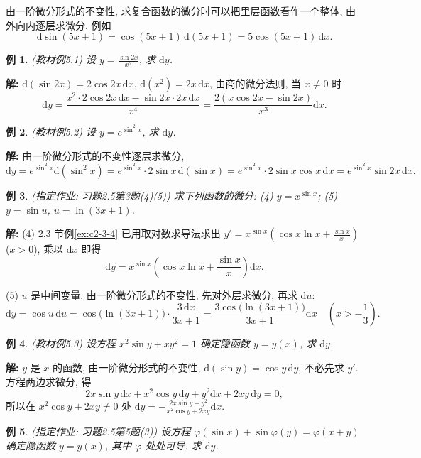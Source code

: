\documentclass[UTF8,openany]{ctexbook}
\theoremstyle{chinesetextbook}
\newtheorem{example}{例}[section]
\newenvironment{cnsolution}{\par\indent\textbf{解:} \ignorespaces}{\par}
\newcommand{\dd}{\mathrm d}
\begin{document}
由一阶微分形式的不变性, 求复合函数的微分时可以把里层函数看作一个整体, 由外向内逐层求微分. 例如
\[
\dd\sin(5x+1)=\cos(5x+1)\,\dd(5x+1)=5\cos(5x+1)\,\dd x.
\]
\begin{example}\label{ex:c2-5-1}
\textnormal{(教材例5.1)} 设 $\displaystyle y=\frac{\sin2x}{x^2}$, 求 $\dd y$.
\end{example}
\begin{cnsolution}
$\dd(\sin2x)=2\cos2x\,\dd x$, $\dd(x^2)=2x\,\dd x$, 由商的微分法则, 当 $x\ne0$ 时
\[
\dd y=\frac{x^2\cdot2\cos2x\,\dd x-\sin2x\cdot2x\,\dd x}{x^4}=\frac{2(x\cos2x-\sin2x)}{x^3}\dd x.
\]
\end{cnsolution}
\begin{example}\label{ex:c2-5-2}
\textnormal{(教材例5.2)} 设 $y=e^{\sin^2x}$, 求 $\dd y$.
\end{example}
\begin{cnsolution}
由一阶微分形式的不变性逐层求微分,
\[
\dd y=e^{\sin^2x}\dd(\sin^2x)=e^{\sin^2x}\cdot2\sin x\,\dd(\sin x)=e^{\sin^2x}\cdot2\sin x\cos x\,\dd x=e^{\sin^2x}\sin2x\,\dd x.
\]
\end{cnsolution}
\begin{example}\label{ex:c2-h5-3}
\textnormal{(指定作业: 习题2.5第3题(4)(5))} 求下列函数的微分: (4) $y=x^{\sin x}$; (5) $y=\sin u$, $u=\ln(3x+1)$.
\end{example}
\begin{cnsolution}
(4) 2.3 节例\ref{ex:c2-3-4} 已用取对数求导法求出 $\displaystyle y'=x^{\sin x}\left(\cos x\ln x+\frac{\sin x}x\right)$ ($x>0$), 乘以 $\dd x$ 即得
\[
\dd y=x^{\sin x}\left(\cos x\ln x+\frac{\sin x}x\right)\dd x.
\]

(5) $u$ 是中间变量. 由一阶微分形式的不变性, 先对外层求微分, 再求 $\dd u$:
\[
\dd y=\cos u\,\dd u=\cos\bigl(\ln(3x+1)\bigr)\cdot\frac{3\,\dd x}{3x+1}=\frac{3\cos\bigl(\ln(3x+1)\bigr)}{3x+1}\dd x\quad\left(x>-\frac13\right).
\]
\end{cnsolution}
\begin{example}\label{ex:c2-5-3}
\textnormal{(教材例5.3)} 设方程 $x^2\sin y+xy^2=1$ 确定隐函数 $y=y(x)$, 求 $\dd y$.
\end{example}
\begin{cnsolution}
$y$ 是 $x$ 的函数, 由一阶微分形式的不变性, $\dd(\sin y)=\cos y\,\dd y$, 不必先求 $y'$. 方程两边求微分, 得
\[
2x\sin y\,\dd x+x^2\cos y\,\dd y+y^2\dd x+2xy\,\dd y=0,
\]
所以在 $x^2\cos y+2xy\ne0$ 处 $\displaystyle\dd y=-\frac{2x\sin y+y^2}{x^2\cos y+2xy}\dd x$.
\end{cnsolution}
\begin{example}\label{ex:c2-h5-5}
\textnormal{(指定作业: 习题2.5第5题(3))} 设方程 $\varphi(\sin x)+\sin\varphi(y)=\varphi(x+y)$ 确定隐函数 $y=y(x)$, 其中 $\varphi$ 处处可导. 求 $\dd y$.
\end{example}
\end{document}

